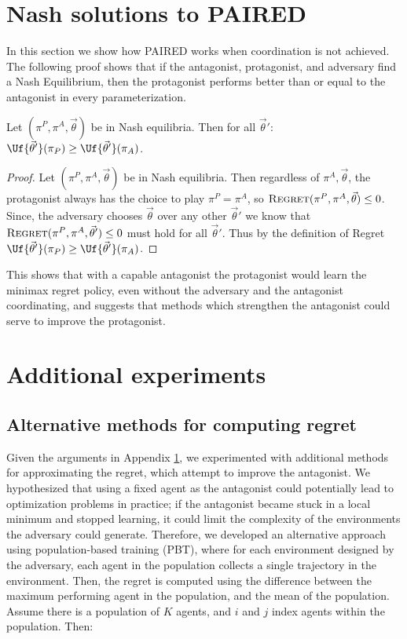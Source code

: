 \documentclass{article}
\begin{document}
\begin{appendix}
\section{Nash solutions to PAIRED}
 \label{Nash_PAIRED}
In this section we show how PAIRED works when coordination is not achieved.  The following proof shows that if the antagonist, protagonist, and adversary find a Nash Equilibrium, then the protagonist performs better than or equal to the antagonist in every parameterization.

\begin{theorem}
    Let $(\pi^P,\pi^A,\vec{\theta})$ be in Nash equilibria. Then for all $\vec{\theta}'$:  $\Uf{\vec{\theta}'}(\pi_P) \geq \Uf{\vec{\theta}'}(\pi_A)$.
\end{theorem}
\begin{proof}
Let $(\pi^P,\pi^A,\vec{\theta})$ be in Nash equilibria.  Then regardless of $\pi^A,\vec{\theta}$, the protagonist always has the choice to play $\pi^P = \pi^A$, so $\normalfont\textsc{Regret}(\pi^P, \pi^A, \vec{\theta}) \leq 0$.  Since, the adversary chooses $\vec{\theta}$ over any other $\vec{\theta}'$ we know that $\normalfont\textsc{Regret}(\pi^P, \pi^A, \vec{\theta}') \leq 0$ must hold for all $\vec{\theta}'$. Thus by the definition of Regret $\Uf{\vec{\theta}'}(\pi_P) \geq \Uf{\vec{\theta}'}(\pi_A)$. 
\end{proof}

This shows that with a capable antagonist the protagonist would learn the minimax regret policy, even without the adversary and the antagonist coordinating, and suggests that methods which strengthen the antagonist could serve to improve the protagonist.

\section{Additional experiments}
\subsection{Alternative methods for computing regret}
\label{sec:app_combined}
Given the arguments in Appendix \ref{Nash_PAIRED}, we experimented with additional methods for approximating the regret, which attempt to improve the antagonist. We hypothesized that using a fixed agent as the antagonist could potentially lead to optimization problems in practice; if the antagonist became stuck in a local minimum and stopped learning, it could limit the complexity of the environments the adversary could generate. Therefore, we developed an alternative approach using population-based training (PBT), where for each environment designed by the adversary, each agent in the population collects a single trajectory in the environment. Then, the regret is computed using the difference between the maximum performing agent in the population, and the mean of the population. Assume there is a population of $K$ agents, and $i$ and $j$ index agents within the population. Then: 


\end{appendix}
\end{document}
